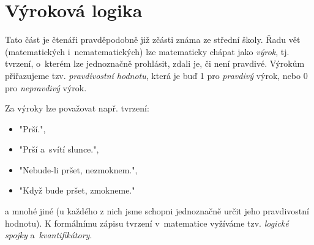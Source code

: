 \section{Výroková logika}\label{sec:vyrokova_logika}

Tato část je čtenáři pravděpodobně již zčásti známa ze střední školy. Řadu vět (matematických i~nematematických) lze matematicky chápat jako \emph{výrok}, tj. tvrzení, o~kterém lze jednoznačně prohlásit, zdali je, či není pravdivé. Výrokům přiřazujeme tzv. \emph{pravdivostní hodnotu}, která je buď 1 pro \emph{pravdivý} výrok, nebo 0 pro \emph{nepravdivý} výrok.\par
Za výroky lze považovat např. tvrzení:
\begin{itemize}
    \item "Prší.",
    \item "Prší a~svítí slunce.",
    \item "Nebude-li pršet, nezmoknem.",
    \item "Když bude pršet, zmokneme."
\end{itemize}
a mnohé jiné (u každého z nich jsme schopni jednoznačně určit jeho pravdivostní hodnotu). K formálnímu zápisu tvrzení v~matematice vyžíváme tzv. \emph{logické spojky} a~\emph{kvantifikátory}.

